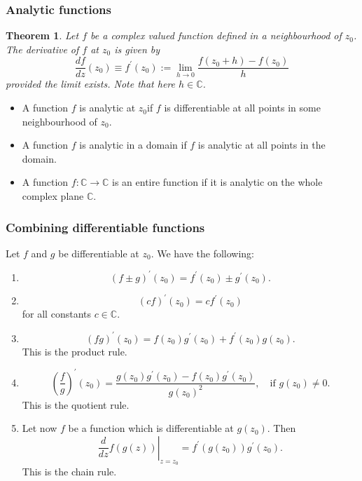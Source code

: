 \documentclass{article}
\newtheorem{theorem}{Theorem}
\begin{document}
\subsubsection{Analytic functions}
\begin{theorem}
    Let $f$ be a complex valued function defined in a neighbourhood of $z_0$. The derivative of $f$ at $z_0$ is given by
    \begin{equation}
        \frac{df}{dz}(z_0)\equiv f^\prime(z_0):=\lim_{h\to 0}\frac{f(z_0+h)-f(z_0)}{h}
    \end{equation}
    provided the limit exists. Note that here $h\in\mathbb{C}$. 
\end{theorem}
\begin{itemize}
    \item A function $f$ is analytic at $z_0$if $f$ is differentiable at all points in some neighbourhood of $z_0$.
    \item A function $f$ is analytic in a domain if $f$ is analytic at all points in the domain.
    \item A function $f:\mathbb{C}\to\mathbb{C}$ is an entire function if it is analytic on the whole complex plane $\mathbb{C}$.
\end{itemize}

\subsubsection{Combining differentiable functions}
Let $f$ and $g$ be differentiable at $z_0$. We have the following:
\begin{enumerate}
    \item 
    \begin{equation}
        (f\pm g)^\prime (z_0) = f^\prime(z_0)\pm g^\prime(z_0). \nonumber
    \end{equation}
    \item
    \begin{equation}
        (cf)^\prime(z_0)=cf^\prime(z_0) \nonumber
    \end{equation}
    for all constants $c\in\mathbb{C}$.
    \item
    \begin{equation}
        (fg)^\prime(z_0)=f(z_0)g^\prime(z_0)+f^\prime(z_0)g(z_0).
    \end{equation}
    This is the product rule.
    \item
    \begin{equation}
        (\frac{f}{g})^\prime (z_0) = \frac{g(z_0)g^\prime(z_0)-f(z_0)g^\prime(z_0)}{g(z_0)^2},\quad \text{if }g(z_0)\neq 0.
    \end{equation}
    This is the quotient rule.
    \item Let now $f$ be a function which is differentiable at $g(z_0)$. Then
    \begin{equation}
        \left.\frac{d}{dz}f(g(z))\right\rvert_{z=z_0} = f^\prime(g(z_0))g^\prime(z_0).
    \end{equation}
    This is the chain rule.
\end{enumerate}
\end{document}
